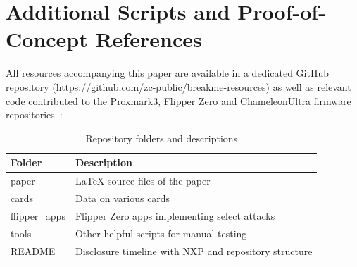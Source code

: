 \documentclass[10pt,letterpaper]{article}
\begin{document}
\section{Additional Scripts and Proof-of-Concept References}
\label{app:tools}
All resources accompanying this paper are available in a dedicated GitHub repository (\url{https://github.com/zc-public/breakme-resources}) as well as relevant code contributed to the Proxmark3, Flipper Zero and ChameleonUltra firmware repositories~\cite{proxmark3,flipperzero,ultra}:

\begin{table}[ht]
  \centering
  \caption{Repository folders and descriptions}
  \label{tab:repo-contents}
  \begin{tabular}{|l|p{}|}
    \hline
    \textbf{Folder} & \textbf{Description} \\ \hline
    paper & LaTeX source files of the paper \\ \hline
    cards & Data on various cards \\ \hline
    flipper\_apps & Flipper Zero apps implementing select attacks \\ \hline
    tools & Other helpful scripts for manual testing \\ \hline
    README & Disclosure timeline with NXP and repository structure\\ \hline
  \end{tabular}
\end{table}
\end{document}
